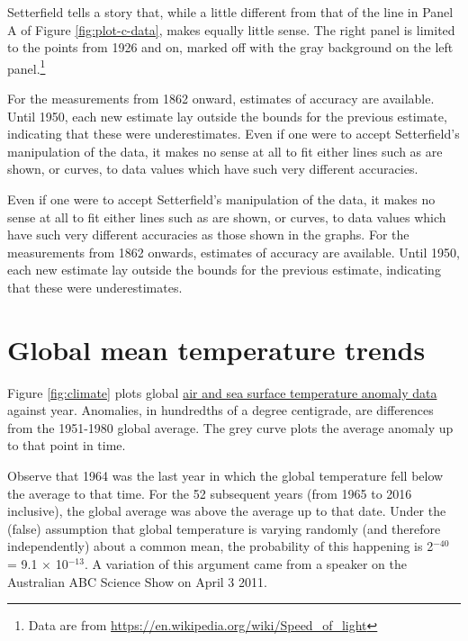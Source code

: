 \documentclass[
  10pt,
  b5paper]{book}
\begin{document}
Setterfield tells a story that, while a little different from that of
the line in Panel A of Figure \ref{fig:plot-c-data}, makes equally
little sense. The right panel is limited to the points from 1926
and on, marked off with the gray background on the left panel.\footnote{Data
  are from \url{https://en.wikipedia.org/wiki/Speed_of_light}}

For the measurements from 1862 onward, estimates of accuracy
are available. Until 1950, each new estimate lay outside the
bounds for the previous estimate, indicating that these
were underestimates.
Even if one were to accept Setterfield's manipulation of the data,
it makes no sense at all to fit either lines such as are shown, or
curves, to data values which have such very different
accuracies.

Even if one were to accept Setterfield's manipulation of the data,
it makes no sense at all to fit either lines such as are shown, or
curves, to data values which have such very different
accuracies as those shown in the graphs. For the
measurements from 1862 onwards, estimates of accuracy are
available. Until 1950, each new estimate lay outside the
bounds for the previous estimate, indicating that these
were underestimates.

\hypertarget{global-mean-temperature-trends}{%
\section{Global mean temperature trends}\label{global-mean-temperature-trends}}

Figure \ref{fig:climate} plots global
\href{http://iridl.ldeo.columbia.edu/SOURCES/.NASA/.GISS/.GISSTEMP/.Global/.LOTI/}{air and sea surface temperature anomaly data}
against year. Anomalies, in hundredths of a degree centigrade, are
differences from the 1951-1980 global average. The grey curve plots
the average anomaly up to that point in time.

Observe that 1964 was the last year in which the global
temperature fell below the average to that time.
For the 52 subsequent years (from 1965 to 2016 inclusive),
the global average was above the average up to that date. Under
the (false) assumption that global temperature is varying
randomly (and therefore independently) about a common mean,
the probability of this happening is 2\(^{-40}\) = 9.1
\(\times\) 10\(^{-13}\). A variation of this argument came
from a speaker on the Australian ABC Science Show on April
3 2011.
\end{document}
